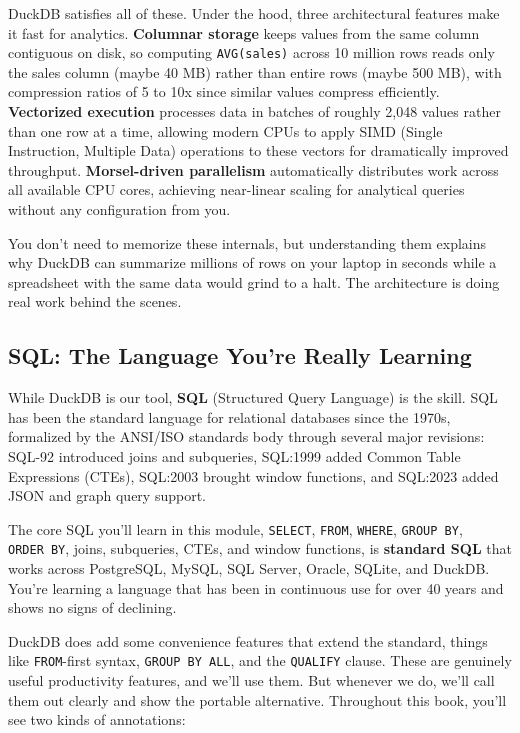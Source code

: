 \documentclass[
  letterpaper,
  DIV=11,
  numbers=noendperiod]{scrreprt}
\begin{document}
DuckDB satisfies all of these. Under the hood, three architectural
features make it fast for analytics. \textbf{Columnar storage} keeps
values from the same column contiguous on disk, so computing
\texttt{AVG(sales)} across 10 million rows reads only the sales column
(maybe 40 MB) rather than entire rows (maybe 500 MB), with compression
ratios of 5 to 10x since similar values compress efficiently.
\textbf{Vectorized execution} processes data in batches of roughly 2,048
values rather than one row at a time, allowing modern CPUs to apply SIMD
(Single Instruction, Multiple Data) operations to these vectors for
dramatically improved throughput. \textbf{Morsel-driven parallelism}
automatically distributes work across all available CPU cores, achieving
near-linear scaling for analytical queries without any configuration
from you.

You don't need to memorize these internals, but understanding them
explains why DuckDB can summarize millions of rows on your laptop in
seconds while a spreadsheet with the same data would grind to a halt.
The architecture is doing real work behind the scenes.

\subsection{SQL: The Language You're Really
Learning}\label{sql-the-language-youre-really-learning}

While DuckDB is our tool, \textbf{SQL} (Structured Query Language) is
the skill. SQL has been the standard language for relational databases
since the 1970s, formalized by the ANSI/ISO standards body through
several major revisions: SQL-92 introduced joins and subqueries,
SQL:1999 added Common Table Expressions (CTEs), SQL:2003 brought window
functions, and SQL:2023 added JSON and graph query support.

The core SQL you'll learn in this module, \texttt{SELECT},
\texttt{FROM}, \texttt{WHERE}, \texttt{GROUP\ BY}, \texttt{ORDER\ BY},
joins, subqueries, CTEs, and window functions, is \textbf{standard SQL}
that works across PostgreSQL, MySQL, SQL Server, Oracle, SQLite, and
DuckDB. You're learning a language that has been in continuous use for
over 40 years and shows no signs of declining.

DuckDB does add some convenience features that extend the standard,
things like \texttt{FROM}-first syntax, \texttt{GROUP\ BY\ ALL}, and the
\texttt{QUALIFY} clause. These are genuinely useful productivity
features, and we'll use them. But whenever we do, we'll call them out
clearly and show the portable alternative. Throughout this book, you'll
see two kinds of annotations:
\end{document}
